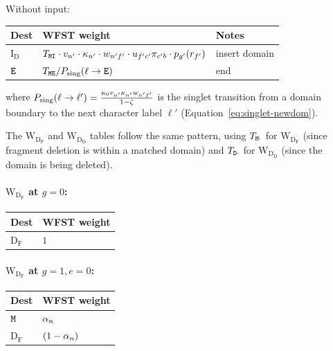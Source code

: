 Without input:
\begin{center}
\renewcommand{\arraystretch}{1.4}
\begin{tabular}{lll}
\hline
Dest & WFST weight & Notes \\
\hline
$\mathrm{I_D}$ &
  $T_{{\tt M}{\tt I}} \cdot v_{n'} \cdot
   \kappa_{n'} \cdot w_{n'f'} \cdot
   u_{f'c'} \pi_{c'b} \cdot p_{g'}(r_{f'})$ &
  insert domain \\
${\tt E}$ & $T_{{\tt M}{\tt E}} / P_{\rm sing}(\ell \to {\tt E})$ &
  end \\
\hline
\end{tabular}
\end{center}

where $P_{\rm sing}(\ell \to \ell') = \frac{\kappa_0 v_{n'} \kappa_{n'} w_{n'f'}}{1-\zeta}$
is the singlet transition from a domain boundary to the next character label $\ell'$
(Equation~\ref{eq:singlet-newdom}).

\bigskip
The $\mathrm{W_{D_F}}$ and $\mathrm{W_{D_D}}$ tables follow the same pattern,
using $T_{{\tt M}\cdot}$ for $\mathrm{W_{D_F}}$ (since fragment deletion
is within a matched domain) and $T_{{\tt D}\cdot}$ for $\mathrm{W_{D_D}}$
(since the domain is being deleted).

\paragraph{$\mathrm{W_{D_F}}$ at $g=0$:}
\begin{center}
\renewcommand{\arraystretch}{1.3}
\begin{tabular}{ll}
\hline
Dest & WFST weight \\
\hline
$\mathrm{D_F}$ & $1$ \\
\hline
\end{tabular}
\end{center}

\paragraph{$\mathrm{W_{D_F}}$ at $g=1, e=0$:}
\begin{center}
\renewcommand{\arraystretch}{1.3}
\begin{tabular}{ll}
\hline
Dest & WFST weight \\
\hline
${\tt M}$ & $\alpha_n$ \\
$\mathrm{D_F}$ & $(1-\alpha_n)$ \\
\hline
\end{tabular}
\end{center}

